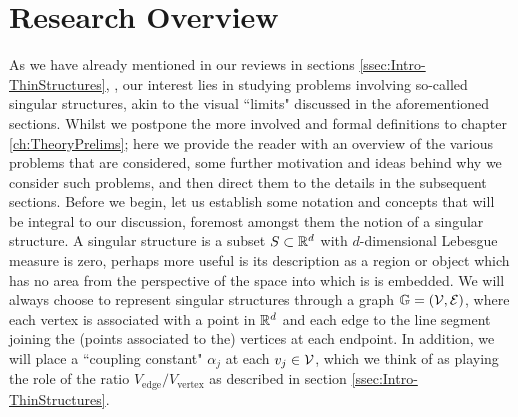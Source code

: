 \section{Research Overview} \label{sec:Intro-ProblemIntroduction}


As we have already mentioned in our reviews in sections \ref{ssec:Intro-ThinStructures}, , our interest lies in studying problems involving so-called singular structures, akin to the visual ``limits" discussed in the aforementioned sections.
Whilst we postpone the more involved and formal definitions to chapter \ref{ch:TheoryPrelims}; here we provide the reader with an overview of the various problems that are considered, some further motivation and ideas behind why we consider such problems, and then direct them to the details in the subsequent sections.
Before we begin, let us establish some notation and concepts that will be integral to our discussion, foremost amongst them the notion of a singular structure.
A singular structure is a subset $S\subset\mathbb{R}^d$ with $d$-dimensional Lebesgue measure is zero, perhaps more useful is its description as a region or object which has no area from the perspective of the space into which is is embedded.
We will always choose to represent singular structures through a graph $\mathbb{G}=\left( \mathcal{V},\mathcal{E} \right)$, where each vertex is associated with a point in $\mathbb{R}^d$ and each edge to the line segment joining the (points associated to the) vertices at each endpoint.
In addition, we will place a ``coupling constant" $\alpha_j$ at each $v_j\in\mathcal{V}$, which we think of as playing the role of the ratio $V_{\mathrm{edge}} / V_{\mathrm{vertex}}$ as described in section \ref{ssec:Intro-ThinStructures}.

